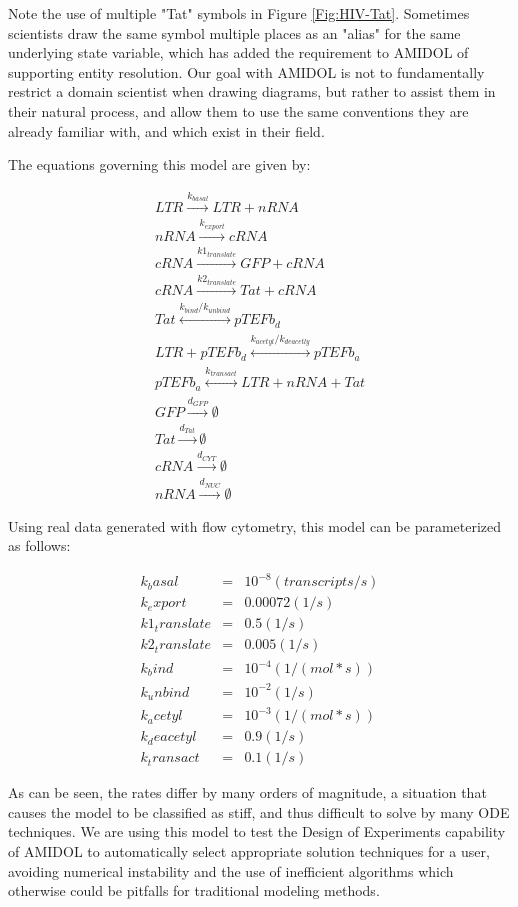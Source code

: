 \documentclass[11pt]{article}
\newcommand{\amidol}{\textsc{AMIDOL}}
\begin{document}
Note the use of multiple "Tat" symbols in Figure \ref{Fig:HIV-Tat}. Sometimes scientists draw the same symbol multiple places as an "alias" for the same underlying state variable, which has added the requirement to \amidol{} of supporting entity resolution.  Our goal with \amidol{} is not to fundamentally restrict a domain scientist when drawing diagrams, but rather to assist them in their natural process, and allow them to use the same conventions they are already familiar with, and which exist in their field.

The equations governing this model are given by:

\begin{eqnarray}
LTR \overset{k_{basal}}{\rightarrow} LTR + nRNA\\
nRNA \overset{k_{export}}{\rightarrow} cRNA\\
  cRNA \overset{k1_{translate}}{\rightarrow} GFP + cRNA\\
  cRNA \overset{k2_{translate}}{\rightarrow} Tat + cRNA\\
  Tat \overset{k_{bind}/k_{unbind}}{\leftrightarrow} pTEFb_d\\
  LTR + pTEFb_d \overset{k_{acetyl}/k_{deacetly}}{\leftrightarrow} pTEFb_a\\
  pTEFb_a \overset{k_{transact}}{\leftrightarrow} LTR + nRNA + Tat\\
  GFP \overset{d_{GFP}}{\rightarrow} \emptyset\\
  Tat \overset{d_{Tat}}{\rightarrow} \emptyset\\
  cRNA \overset{d_{CYT}}{\rightarrow} \emptyset\\
  nRNA \overset{d_{NUC}}{\rightarrow} \emptyset
\end{eqnarray}

Using real data generated with flow cytometry, this model can be parameterized as follows:

\begin{eqnarray}
k_basal &=& 10^{-8} (transcripts/s)\\
  k_export &=& 0.00072 (1/s)\\
  k1_translate &=& 0.5 (1/s)\\
  k2_translate &=& 0.005 (1/s)\\
  k_bind &=& 10^{-4} (1/(mol * s))\\
  k_unbind &=& 10^{-2} (1/s)\\
  k_acetyl &=& 10^{-3} (1/(mol * s))\\
  k_deacetyl &=& 0.9 (1/s)\\
  k_transact &=& 0.1 (1/s)
\end{eqnarray}

As can be seen, the rates differ by many orders of magnitude, a situation that causes the model to be classified as stiff, and thus difficult to solve by many ODE techniques.  We are using this model to test the Design of Experiments capability of \amidol{} to automatically select appropriate solution techniques for a user, avoiding numerical instability and the use of inefficient algorithms which otherwise could be pitfalls for traditional modeling methods.
\end{document}
